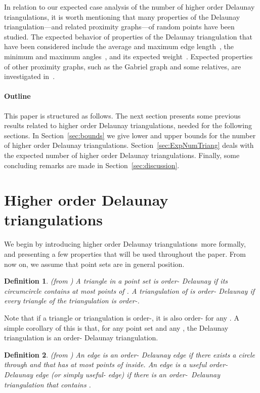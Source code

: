 \documentclass {journal}
\newtheorem {definition} {Definition}
\newcommand {\hodts}{higher order Delaunay triangulations}
\newcommand {\Hodts}{Higher order Delaunay triangulations}
\newcommand {\orderk}{\mbox{order-}}
\begin{document}
In relation to our expected case analysis of the number of \hodts, it is worth mentioning that many properties of the Delaunay triangulation---and related proximity graphs---of random points have been studied.
The expected behavior of properties of the Delaunay triangulation that have been considered include the average and maximum edge length~\cite{m-hpppp-70,bey-eedt-91a}, the minimum and maximum angles~\cite{bey-eedt-91a}, and its expected weight~\cite{cl-aldt-84}.
Expected properties of other proximity graphs, such as the Gabriel graph and some relatives, are investigated in~\cite{d-essgc-88,c-psepg-92,ms-pggrg-80}.


\paragraph{Outline} This paper is structured as follows.
The next section presents some previous results related to \hodts,
needed for the following sections. In Section~\ref{sec:bounds} we
give lower and upper bounds for the number of \hodts.
Section~\ref{sec:ExpNumTriang} deals with the expected number of
\hodts. Finally, some concluding remarks are made in
Section~\ref{sec:discussion}.

\section{\Hodts}
\label{sec:hodts} We begin by introducing \hodts\ more formally,
and presenting a few properties that will be used throughout the
paper. From now on, we assume that point sets are in general
position.



\begin{definition}\label{def:Order}
(from \cite{ghk-hodt-02}) A triangle  in a point set  is \emph{order- Delaunay} if its circumcircle  contains at most  points of . A triangulation of  is \emph{order- Delaunay} if every triangle of the triangulation is order-.
\end{definition}


Note that if a triangle or triangulation is order-, it is also order- for any . A simple corollary of this is that, for any point set and  any , the Delaunay triangulation is an order- Delaunay triangulation.

\begin{definition}
(from \cite{ghk-hodt-02}) An edge  is an order-
Delaunay edge if there exists a circle through  and  that
has at most  points of  inside. An edge 
is a \emph{useful} order- Delaunay edge (or simply
\emph{useful- edge}) if there is an \orderk\ Delaunay
triangulation that contains .
\end{definition}
\end{document}
